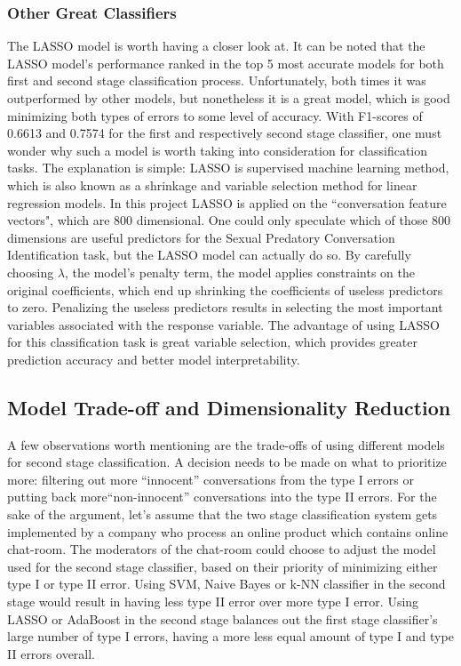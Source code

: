 \documentclass[11pt]{article}
\begin{document}
\subsubsection{Other Great Classifiers}
The LASSO model is worth having a closer look at. It can be noted that the LASSO model's performance ranked in the top 5 most accurate models for both first and second stage classification process. Unfortunately, both times it was outperformed by other models, but nonetheless it is a great model, which is good minimizing both types of errors to some level of accuracy. With F1-scores of 0.6613 and 0.7574 for the first and respectively second stage classifier, one must wonder why such a model is worth taking into consideration for classification tasks. The explanation is simple: LASSO is supervised machine learning method, which is also known as a shrinkage and variable selection method for linear regression models. In this project LASSO is applied on the ``conversation feature vectors", which are 800 dimensional. One could only speculate which of those 800 dimensions are useful predictors for the Sexual Predatory Conversation Identification task, but the LASSO model can actually do so. By carefully choosing $\lambda$, the model's penalty term, the model applies constraints on the original coefficients, which end up shrinking the coefficients of useless predictors to zero. Penalizing the useless predictors results in selecting the most important variables associated with the response variable. The advantage of using LASSO for this classification task is great variable selection, which provides greater prediction accuracy and better model interpretability.


\subsection{Model Trade-off and Dimensionality Reduction}
A few observations worth mentioning are the trade-offs of using different models for second stage classification. A decision needs to be made on what to prioritize more: filtering out more ``innocent” conversations from the type I errors or putting back more``non-innocent” conversations into the type II errors. For the sake of the argument, let's assume that the two stage classification system gets implemented by a company who process an online product which contains online chat-room. The moderators of the chat-room could choose to adjust the model used for the second stage classifier, based on their priority of minimizing either type I or type II error. Using SVM, Naive Bayes or k-NN classifier in the second stage would result in having less type II error over more type I error. Using LASSO or AdaBoost in the second stage balances out the first stage classifier's large number of type I errors, having a more less equal amount of type I and type II errors overall.
\end{document}
